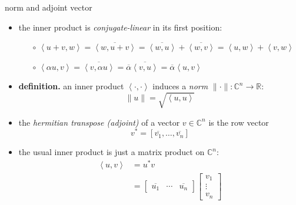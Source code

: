 \documentclass[10pt,hyperref]{beamer}
\newcommand{\CC}{\mathbb{C}}
\newcommand{\RR}{\mathbb{R}}
\newcommand{\ip}[2]{\left<#1,#2\right>}
\begin{document}
\begin{frame}{norm and adjoint vector}

\begin{itemize}
\item the inner product is \emph{conjugate-linear} in its first position:
    \begin{itemize}
    \item[$\circ$] $\ip{u+v}{w} = \overline{\ip{w}{u+v}} = \overline{\ip{w}{u}} + \overline{\ip{w}{v}} = \ip{u}{w} + \ip{v}{w}$
    \item[$\circ$] $\ip{\alpha u}{v} =\overline{\ip{v}{\alpha u}} = \overline{\alpha} \overline{\ip{v}{u}} =\overline{\alpha} \ip{u}{v}$
    \end{itemize}
\item \textbf{definition.}  an inner product $\ip{\cdot}{\cdot}$ induces a \emph{norm} $\|\cdot\|:\CC^n \to \RR$:
    $$\|u\| = \sqrt{\ip{u}{u}}$$
\item the \emph{hermitian transpose (adjoint)} of a vector $v\in\CC^n$ is the row vector
    $$v^* = [\overline{v_1},\dots,\overline{v_n}]$$
\item the usual inner product is just a matrix product on $\CC^n$:
\begin{align*}
\ip{u}{v} &= u^* v \\
          &= \begin{bmatrix}
    \overline{u_1} & \cdots & \overline{u_n}
    \end{bmatrix} \begin{bmatrix}
    v_1 \\ \vdots \\ v_n
    \end{bmatrix}
\end{align*}
\end{itemize}
\end{frame}
\end{document}
